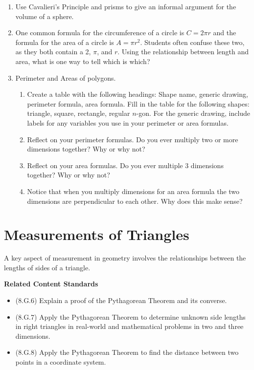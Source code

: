 \documentclass[
]{book}
\providecommand{\tightlist}{%
  \setlength{\itemsep}{0pt}\setlength{\parskip}{0pt}}
\newenvironment{standards}{}{}
\theoremstyle{definition}
\theoremstyle{definition}
\theoremstyle{definition}
\theoremstyle{definition}
\theoremstyle{remark}
\begin{document}
\begin{enumerate}
\def\labelenumi{\arabic{enumi}.}
\item
  Use Cavalieri's Principle and prisms to give an informal argument for the volume of a sphere.
\item
  One common formula for the circumference of a circle is \(C= 2 \pi r\) and the formula for the area of a circle is \(A=\pi r^2\). Students often confuse these two, as they both contain a 2, \(\pi\), and \(r\). Using the relationship between length and area, what is one way to tell which is which?
\item
  Perimeter and Areas of polygons.

  \begin{enumerate}
  \def\labelenumii{\alph{enumii}.}
  \tightlist
  \item
    Create a table with the following headings: Shape name, generic drawing, perimeter formula, area formula. Fill in the table for the following shapes: triangle, square, rectangle, regular \(n\)-gon. For the generic drawing, include labels for any variables you use in your perimeter or area formulas.
  \item
    Reflect on your perimeter formulas. Do you ever multiply two or more dimensions together? Why or why not?
  \item
    Reflect on your area formulas. Do you ever multiple 3 dimensions together? Why or why not?
  \item
    Notice that when you multiply dimensions for an area formula the two dimensions are perpendicular to each other. Why does this make sense?
  \end{enumerate}
\end{enumerate}

\hypertarget{measurements-of-triangles}{%
\section{Measurements of Triangles}\label{measurements-of-triangles}}

A key aspect of measurement in geometry involves the relationships between the lengths of sides of a triangle.

\begin{standards}

\begin{center}
\textbf{Related Content Standards}

\end{center}

\begin{itemize}
\tightlist
\item
  (8.G.6) Explain a proof of the Pythagorean Theorem and its converse.
\item
  (8.G.7) Apply the Pythagorean Theorem to determine unknown side lengths in right triangles in real-world and mathematical problems in two and three dimensions.
\item
  (8.G.8) Apply the Pythagorean Theorem to find the distance between two points in a coordinate system.
\end{itemize}

\end{standards}
\end{document}

